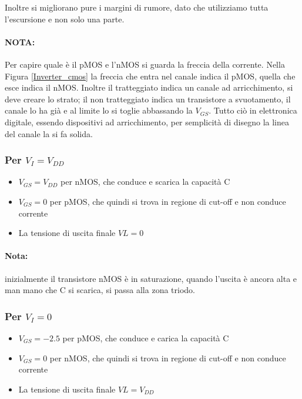 Inoltre si migliorano pure i margini di rumore, dato che utilizziamo tutta l'escursione e non solo una parte.


\paragraph{NOTA:} Per capire quale è il pMOS e l'nMOS si guarda la freccia della corrente. Nella Figura \ref{Inverter_cmos} la freccia che entra nel canale indica il pMOS, quella che esce indica il nMOS. Inoltre il tratteggiato indica un canale ad arricchimento, si deve creare lo strato; il non tratteggiato indica un transistore a svuotamento, il canale lo ha già e al limite lo si toglie abbassando la $V_{GS}$. Tutto ciò in elettronica digitale, essendo dispositivi ad arricchimento, per semplicità di disegno la linea del canale la si fa solida.

\subsubsection{Per $V_I = V_{DD}$}

\begin{itemize}
    \item $V_{GS} =	V_{DD}$ per	nMOS,	che conduce	e	scarica la	capacità C
    \item $V_{GS} =	0$	per	pMOS,	che quindi si trova in	regione di	cut-off	e non	conduce	corrente
    \item La	tensione di	uscita finale	$VL =	0$
\end{itemize}


\paragraph{Nota:} inizialmente il transistore nMOS è in	saturazione,	quando l'uscita è ancora alta e man	mano che C	si scarica,
si passa alla zona triodo.

\subsubsection{Per $V_I = 0$}

\begin{itemize}
    \item $V_{GS} =	-2.5$ per	pMOS,	che conduce	e	carica la	capacità C
    \item $V_{GS} =	0$	per	nMOS,	che quindi si trova in	regione di	cut-off	e	non	conduce	corrente
    \item La	tensione di	uscita finale	$VL =	V_{DD}$
\end{itemize}

